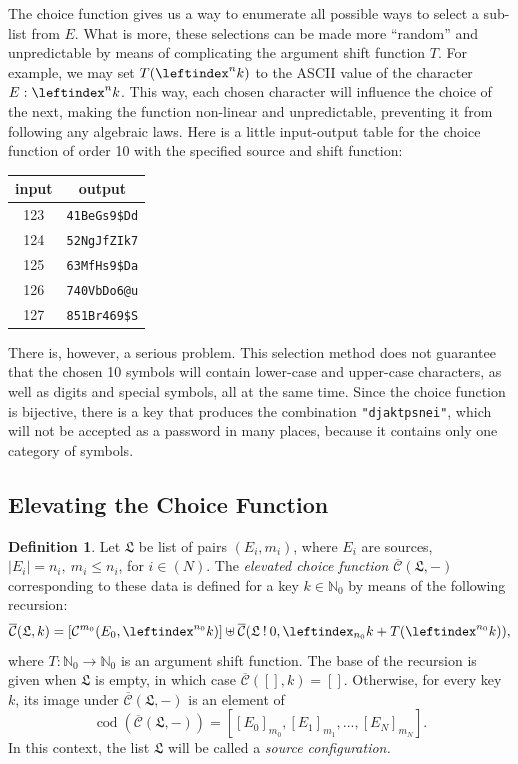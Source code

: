 \documentclass[a4paper, 10pt]{article}
\theoremstyle{plain}
\theoremstyle{definition}
\newtheorem{definition}[theorem]{Definition}
\newcommand{\N}{\mathbb{N}}
\newcommand{\wo}{\mathbin{!}}
\newcommand{\li}{\leftindex}
\newcommand{\cc}{\mathcal{C}}
\newcommand{\conf}{\mathfrak{L}}
\newcommand{\elv}{\overline{\mathcal{C}}}
\begin{document}
The choice function gives us a way to enumerate all possible ways to select a sub-list from $E$. What is more, these selections can be made more ``random'' and unpredictable by means of complicating the argument shift function $T$. For example, we may set $T(\li^n k)$ to the ASCII value of the character $E : \li^n k$. This way, each chosen character will influence the choice of the next, making the function non-linear and unpredictable, preventing it from following any algebraic laws. Here is a little input-output table for the choice function of order 10 with the specified source and shift function:

\begin{center}
\renewcommand{\arraystretch}{1.5}
\begin{tabular}{c|c}
  input & output\\
  \hline
  123 & \texttt{41BeGs9\$Dd}\\
  \hline
  124 & \texttt{52NgJfZIk7}\\
  \hline
  125 & \texttt{63MfHs9\$Da}\\
  \hline
  126 & \texttt{740VbDo6@u}\\
  \hline
  127 & \texttt{851Br469\$S}\\
\end{tabular}
\end{center}

There is, however, a serious problem. This selection method does not guarantee that the chosen 10 symbols will contain lower-case and upper-case characters, as well as digits and special symbols, all at the same time. Since the choice function is bijective, there is a key that produces the combination \texttt{"djaktpsnei"}, which will not be accepted as a password in many places, because it contains only one category of symbols.

\subsection{Elevating the Choice Function}

\begin{definition}
  Let $\conf$ be list of pairs $(E_i, m_i)$, where $E_i$ are sources, $|E_i| = n_i,\ m_i \le n_i$, for $i \in (N)$. The \emph{elevated choice function} $\elv(\conf, -)$ corresponding to these data is defined for a key $k \in \N_0$ by means of the following recursion:
  \[
    \elv(\conf, k) = \left[ \cc^{m_0}(E_0, \li^{n_0} k) \right] \uplus \elv(\conf \wo 0, \li_{n_0} k + T(\li^{n_0} k)),
  \]
  where $T \colon \N_0 \to \N_0$ is an argument shift function. The base of the recursion is given when $\conf$ is empty, in which case $\elv([], k) = []$. Otherwise, for every key $k$, its image under $\elv(\conf, -)$ is an element of
  \[
    \operatorname{cod} \left( \elv(\conf, -) \right) = \left[ [E_0]_{m_0}, [E_1]_{m_1}, ..., [E_N]_{m_N} \right].
  \]
  In this context, the list $\conf$ will be called a \emph{source configuration.}
\end{definition}
\end{document}
